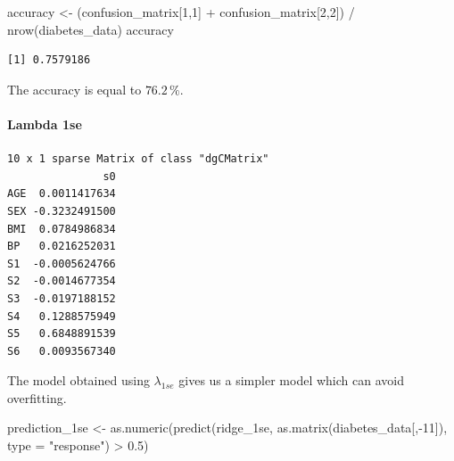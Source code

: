 \documentclass[
]{article}
\newenvironment{Shaded}{\begin{snugshade}}{\end{snugshade}}
\newcommand{\AttributeTok}[1]{\textcolor[rgb]{0.77,0.63,0.00}{#1}}
\newcommand{\DecValTok}[1]{\textcolor[rgb]{0.00,0.00,0.81}{#1}}
\newcommand{\FloatTok}[1]{\textcolor[rgb]{0.00,0.00,0.81}{#1}}
\newcommand{\FunctionTok}[1]{\textcolor[rgb]{0.00,0.00,0.00}{#1}}
\newcommand{\NormalTok}[1]{#1}
\newcommand{\OtherTok}[1]{\textcolor[rgb]{0.56,0.35,0.01}{#1}}
\newcommand{\SpecialCharTok}[1]{\textcolor[rgb]{0.00,0.00,0.00}{#1}}
\newcommand{\StringTok}[1]{\textcolor[rgb]{0.31,0.60,0.02}{#1}}
\begin{document}
\begin{Shaded}
\begin{Highlighting}[]
\NormalTok{accuracy }\OtherTok{\textless{}{-}}\NormalTok{ (confusion\_matrix[}\DecValTok{1}\NormalTok{,}\DecValTok{1}\NormalTok{] }\SpecialCharTok{+}\NormalTok{ confusion\_matrix[}\DecValTok{2}\NormalTok{,}\DecValTok{2}\NormalTok{]) }\SpecialCharTok{/} \FunctionTok{nrow}\NormalTok{(diabetes\_data)}
\NormalTok{accuracy}
\end{Highlighting}
\end{Shaded}

\begin{verbatim}
[1] 0.7579186
\end{verbatim}

The accuracy is equal to \(76.2\,\%\).

\hypertarget{lambda-1se}{%
\paragraph{Lambda 1se}\label{lambda-1se}}

\begin{Shaded}
\end{Shaded}

\begin{verbatim}
10 x 1 sparse Matrix of class "dgCMatrix"
               s0
AGE  0.0011417634
SEX -0.3232491500
BMI  0.0784986834
BP   0.0216252031
S1  -0.0005624766
S2  -0.0014677354
S3  -0.0197188152
S4   0.1288575949
S5   0.6848891539
S6   0.0093567340
\end{verbatim}

The model obtained using \(\lambda_{1se}\) gives us a simpler model
which can avoid overfitting.

\begin{Shaded}
\begin{Highlighting}[]
\NormalTok{prediction\_1se }\OtherTok{\textless{}{-}} \FunctionTok{as.numeric}\NormalTok{(}\FunctionTok{predict}\NormalTok{(ridge\_1se, }\FunctionTok{as.matrix}\NormalTok{(diabetes\_data[,}\SpecialCharTok{{-}}\DecValTok{11}\NormalTok{]), }\AttributeTok{type =} \StringTok{"response"}\NormalTok{) }\SpecialCharTok{\textgreater{}} \FloatTok{0.5}\NormalTok{)}
\end{Highlighting}
\end{Shaded}
\end{document}
